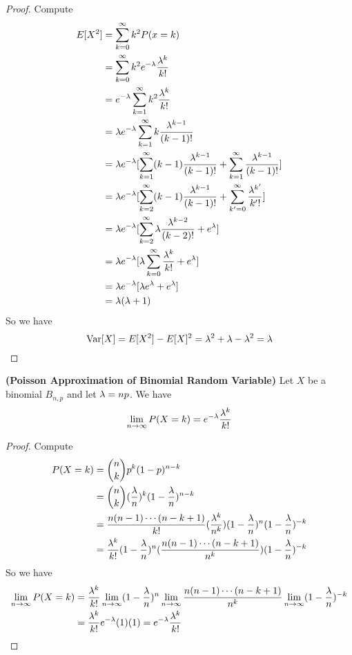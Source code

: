 \documentclass{report}
\begin{document}
\begin{proof}
Compute 
\begin{align}
E[X^2]&=\sum_{k=0}^\infty k^2P(x=k)\\
&=\sum_{k=0}^\infty k^2e^{-\lambda }\frac{\lambda^k}{k!}\\
&=e^{-\lambda } \sum_{k=1}^\infty k^2 \frac{\lambda ^k}{k!}\\
&=\lambda e^{-\lambda }\sum_{k=1}^\infty k \frac{\lambda^{k-1}}{(k-1)!}\\
&=\lambda e^{-\lambda }[\sum_{k=1}^\infty (k-1)\frac{\lambda ^{k-1}}{(k-1)!}+\sum_{k=1}^\infty \frac{\lambda ^{k-1}}{(k-1)!}]\\
&=\lambda  e^{-\lambda}[\sum_{k=2}^\infty (k-1) \frac{\lambda ^{k-1}}{(k-1)!}+\sum_{k'=0}^\infty \frac{\lambda ^{k'}}{k'!}]\\
&=\lambda e^{-\lambda }[\sum_{k=2}^\infty \lambda \frac{\lambda ^{k-2}}{(k-2)!}+e^{\lambda }]\\
&=\lambda e^{-\lambda }[\lambda \sum_{k=0}^\infty \frac{\lambda ^k}{k!}+e^\lambda ]\\
&=\lambda e^{-\lambda }[\lambda e^{\lambda }+e^{\lambda }]\\
&=\lambda (\lambda +1)
\end{align}
So we have
\begin{equation}
\text{Var} [X]=E[X^2]-E[X]^2=\lambda ^2+\lambda -\lambda ^2=\lambda 
\end{equation}
\end{proof}
\begin{theorem}
\label{1.1.18}
\textbf{(Poisson Approximation of Binomial Random Variable)} Let $X$ be a binomial $B_{n,p}$ and let $\lambda =np$. We have
\begin{equation}
  \lim_{n\to\infty}P(X=k)=e^{-\lambda }\frac{\lambda ^k}{k!}
\end{equation}
\end{theorem}
\begin{proof}
Compute
\begin{align}
P(X=k)&=\binom{n}{k}p^k (1-p)^{n-k}\\
&=\binom{n}{k}(\frac{\lambda }{n})^k(1-\frac{\lambda }{n})^{n-k}\\
&=\frac{n(n-1)\cdots (n-k+1)}{k!}(\frac{\lambda ^k}{n^k})(1-\frac{\lambda }{n})^n(1-\frac{\lambda }{n})^{-k}\\
&=\frac{\lambda ^k}{k!}(1-\frac{\lambda }{n})^n(\frac{n(n-1)\cdots (n-k+1)}{n^k})(1-\frac{\lambda }{n})^{-k}
\end{align}
So we have
\begin{align}
  \lim_{n\to\infty}P(X=k)&=\frac{\lambda ^k}{k!}\lim_{n\to\infty}(1-\frac{\lambda}{n})^n\lim_{n\to\infty}\frac{n(n-1)\cdots (n-k+1)}{n^k}\lim_{n\to\infty}(1-\frac{\lambda}{n})^{-k}\\
&=\frac{\lambda ^k}{k!}e^{-\lambda }(1)(1)=e^{-\lambda }\frac{\lambda ^k}{k!}
\end{align}
\end{proof}
\end{document}
